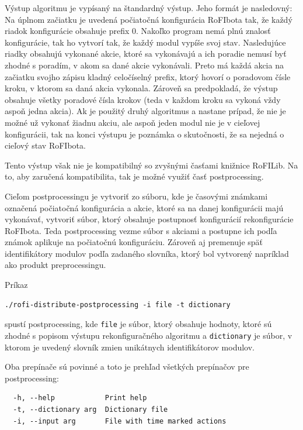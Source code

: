 \documentclass[
  digital, %
  oneside, %
  table,   %
  lof,     %
  nolot,     %
]{fithesis3}
\begin{document}
Výstup algoritmu je vypísaný na štandardný výstup. Jeho formát je nasledovný: Na úplnom začiatku je uvedená počiatočná konfigurácia RoFIbota tak, že každý riadok konfigurácie obsahuje prefix $0$. Nakoľko program nemá plnú znalosť konfigurácie, tak ho vytvorí tak, že každý modul vypíše svoj stav. Nasledujúce riadky obsahujú vykonané akcie, ktoré sa vykonávajú a ich poradie nemusí byť zhodné s poradím, v akom sa dané akcie vykonávali. Preto má každá akcia na začiatku svojho zápisu kladný celočíselný prefix, ktorý hovorí o poradovom čísle kroku, v ktorom sa daná akcia vykonala. Zároveň sa predpokladá, že výstup obsahuje všetky poradové čísla krokov (teda v každom kroku sa vykoná vždy aspoň jedna akcia). Ak je použitý druhý algoritmus a nastane prípad, že nie je možné už vykonať žiadnu akciu, ale aspoň jeden modul nie je v cieľovej konfigurácii, tak na konci výstupu je poznámka o skutočnosti, že sa nejedná o cieľový stav RoFIbota. 

Tento výstup však nie je kompatibilný so zvyšnými časťami knižnice RoFILib. Na to, aby zaručená kompatibilita, tak je možné využiť časť postprocessing. 

Cieľom postprocessingu je vytvoriť zo súboru, kde je časovými známkami označená počiatočná konfigurácia a akcie, ktoré sa na danej konfigurácii majú vykonávať, vytvoriť súbor, ktorý obsahuje postupnosť konfigurácií rekonfigurácie RoFIbota. Teda postprocessing vezme súbor s akciami a postupne ich podľa známok aplikuje na počiatočnú konfiguráciu. Zároveň aj premenuje späť identifikátory modulov podľa zadaného slovníka, ktorý bol vytvorený napríklad ako produkt preprocessingu. 

Príkaz 

\begin{verbatim}
./rofi-distribute-postprocessing -i file -t dictionary
\end{verbatim}

 spustí postprocessing, kde \texttt{file} je súbor, ktorý obsahuje hodnoty, ktoré sú zhodné s popisom výstupu rekonfiguračného algoritmu a \texttt{dictionary} je súbor, v ktorom je uvedený slovník zmien unikátnych identifikátorov modulov. 
 
 Oba prepínače sú povinné a toto je prehľad všetkých prepínačov pre postprocessing: 

\begin{verbatim}
  -h, --help            Print help
  -t, --dictionary arg  Dictionary file
  -i, --input arg       File with time marked actions 
\end{verbatim}
\end{document}
